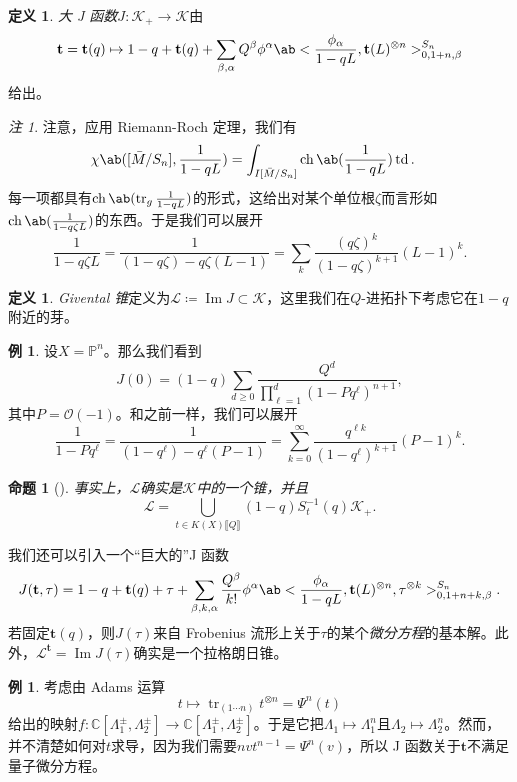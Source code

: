 \documentclass{amsart}
\newtheorem{prop}[thm]{命题}
\theoremstyle{definition}
\newtheorem{defn}[thm]{定义}
\newtheorem{exm}[thm]{例}
\theoremstyle{remark}
\newtheorem{rmk}[thm]{注}
\theoremstyle{plain}
\theoremstyle{definition}
\theoremstyle{remark}
\DeclareMathOperator{\Ima}{Im}
\newcommand{\C}{\mathbb{C}}
\renewcommand{\P}{\mathbb{P}}
\newcommand{\mc}[1]{\mathcal{#1}}
\newcommand{\on}[1]{\operatorname{#1}}
\newcommand{\1}{\mathbf{1}}
\newcommand{\2}{\mathbf{2}}
\newcommand{\3}{\mathbf{3}}
\newcommand{\ps}[1]{\llbracket #1 \rrbracket}
\begin{document}
\begin{defn}
    \textit{大 J 函数}\(J \colon \mc{K}_+ \to \mc{K}\)由
    \[ \mathbf{t} = \mathbf{t}(q) \mapsto 1 - q + \mathbf{t}(q) + \sum_{\beta, \alpha} Q^{\beta} \phi^{\alpha} \ab< \frac{\phi_{\alpha}}{1-qL}, \mathbf{t}(L)^{\otimes n}>_{0, 1+n, \beta}^{S_n} \]
    给出。
\end{defn}

\begin{rmk}
    注意，应用 Riemann-Roch 定理，我们有
    \begin{align*}
        \chi\ab([\bar{M}/S_n], \frac{1}{1-qL}) &= \int_{I[\bar{M}/S_n]} \on{ch}\ab(\frac{1}{1-qL}) \on{td}.
    \end{align*}
    每一项都具有\(\on{ch}\ab(\on{tr}_g \frac{1}{1-qL})\)的形式，这给出对某个单位根\(\zeta\)而言形如\(\on{ch}\ab(\frac{1}{1-q\zeta L})\)的东西。于是我们可以展开
    \[ \frac{1}{1-q\zeta L} = \frac{1}{(1-q \zeta) - q\zeta (L-1)} = \sum_k \frac{(q\zeta)^k}{(1-q\zeta)^{k+1}}(L-1)^k. \]
\end{rmk}

\begin{defn}
    \textit{Givental 锥}定义为\(\mc{L} \coloneqq \Ima J \subset \mc{K}\)，这里我们在\(Q\)-进拓扑下考虑它在\(1-q\)附近的芽。
\end{defn}

\begin{exm}
    设\(X = \P^n\)。那么我们看到
    \[ J(0) = (1-q) \sum_{d \geq 0} \frac{Q^d}{\prod_{\ell=1}^d (1-Pq^{\ell})^{n+1}}, \]
    其中\(P = \mc{O}(-1)\)。和之前一样，我们可以展开
    \[ \frac{1}{1-P q^{\ell}} = \frac{1}{(1-q^{\ell}) - q^{\ell}(P-1)} = \sum_{k=0}^{\infty} \frac{q^{\ell k}}{(1-q^{\ell})^{k+1}}(P-1)^k. \]
\end{exm}

\begin{prop}[{\cite{GiventalK7}}]
    事实上，\(\mc{L}\)确实是\(\mc{K}\)中的一个锥，并且
    \[ \mc{L} = \bigcup_{t \in K(X)\ps{Q}} (1-q) S_{t}^{-1}(q) \mc{K}_+. \]
\end{prop}

我们还可以引入一个“巨大的”J 函数
\[ J(\mathbf{t}, \tau) = 1-q + \mathbf{t}(q) + \tau + \sum_{\beta, k, \alpha} \frac{Q^{\beta}}{k!} \phi^{\alpha} \ab< \frac{\phi_{\alpha}}{1-qL}, \mathbf{t}(L)^{\otimes n}, \tau^{\otimes k}>_{0,1+n+k,\beta}^{S_n}. \]
若固定\(\mathbf{t}(q)\)，则\(J(\tau)\)来自 Frobenius 流形上关于\(\tau\)的某个\textit{微分方程}的基本解。此外，\(\mc{L}^{\mathbf{t}}=  \Ima J(\tau)\)确实是一个拉格朗日锥。

\begin{exm}
    考虑由 Adams 运算
    \[ t \mapsto \on{tr}_{(1\cdots n)} t^{\otimes n} = \Psi^n (t) \]
    给出的映射\(f \colon \C[\Lambda_1^{\pm}, \Lambda_2^{\pm}] \to \C[\Lambda_1^{\pm}, \Lambda_2^{\pm}]\)。于是它把\(\Lambda_1 \mapsto \Lambda_1^n\)且\(\Lambda_2 \mapsto \Lambda_2^n\)。然而，并不清楚如何对\(t\)求导，因为我们需要\(nv t^{n-1} = \Psi^n(v)\)，所以 J 函数关于\(\mathbf{t}\)不满足量子微分方程。
\end{exm}
\end{document}
